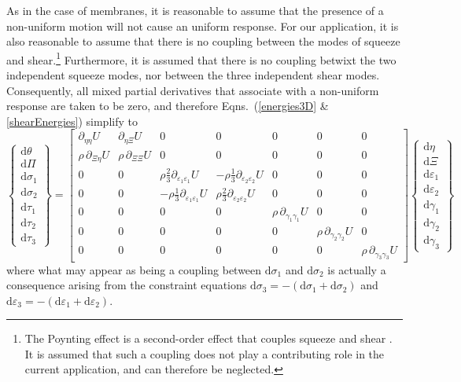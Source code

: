 As in the case of membranes, it is reasonable to assume that the presence of a non-uniform motion will not cause an uniform response.  For our application, it is also reasonable to assume that there is no coupling between the modes of squeeze and shear.\footnote{
   The Poynting effect is a second-order effect that couples squeeze and shear \cite{FreedZamani19}.  It is assumed that such a coupling does not play a contributing role in the current application, and can therefore be neglected.
}
Furthermore, it is assumed that there is no coupling betwixt the two independent squeeze modes, nor between the three independent shear modes.  Consequently, all mixed partial derivatives that associate with a non-uniform response are taken to be zero, and therefore Eqns.~(\ref{energies3D} \& \ref{shearEnergies}) simplify to
\begin{displaymath}
\left\{ \begin{matrix}
\mathrm{d} \theta \\ \mathrm{d} \Pi \\
\mathrm{d} \sigma_1 \\ \mathrm{d} \sigma_2 \\ 
\mathrm{d} \tau_1 \\ \mathrm{d} \tau_2 \\ \mathrm{d} \tau_3
\end{matrix} \right\} = \begin{bmatrix}
\partial_{\eta\eta} U & \partial_{\eta\Xi} U & 0 & 0 & 0 & 0 & 0 \\
\rho \, \partial_{\Xi\eta} U & \rho \, \partial_{\Xi\Xi} U & 0 & 0 & 0 & 0 & 0 \\
0 & 0 & \rho \tfrac{2}{3} \partial_{\varepsilon_1 \varepsilon_1} U & -\rho \tfrac{1}{3} \partial_{\varepsilon_2 \varepsilon_2} U & 0 & 0 & 0 \\
0 & 0 & -\rho \tfrac{1}{3} \partial_{\varepsilon_1 \varepsilon_1} U & \rho \tfrac{2}{3} \partial_{\varepsilon_2 \varepsilon_2} U & 0 & 0 & 0 \\
0 & 0 & 0 & 0 & \rho \, \partial_{\gamma_1\gamma_1} U & 0 & 0 \\
0 & 0 & 0 & 0 & 0 & \rho \, \partial_{\gamma_2\gamma_2} U & 0 \\
0 & 0 & 0 & 0 & 0 & 0 & \rho \, \partial_{\gamma_3\gamma_3} U
\end{bmatrix}
\left\{ \begin{matrix}
\mathrm{d}\eta \\ \mathrm{d} \Xi \\
\mathrm{d} \varepsilon_1 \\ \mathrm{d} \varepsilon_2 \\
\mathrm{d} \gamma_1 \\ \mathrm{d} \gamma_2 \\ \mathrm{d} \gamma_3
\end{matrix} \right\}
\end{displaymath}
where what may appear as being a coupling between $\mathrm{d} \sigma_1$ and $\mathrm{d} \sigma_2$ is actually a consequence arising from the constraint equations $\mathrm{d} \sigma_3 = -( \mathrm{d} \sigma_1 + \mathrm{d} \sigma_2 )$ and $\mathrm{d} \varepsilon_3 = -( \mathrm{d} \varepsilon_1 + \mathrm{d} \varepsilon_2 )$.


